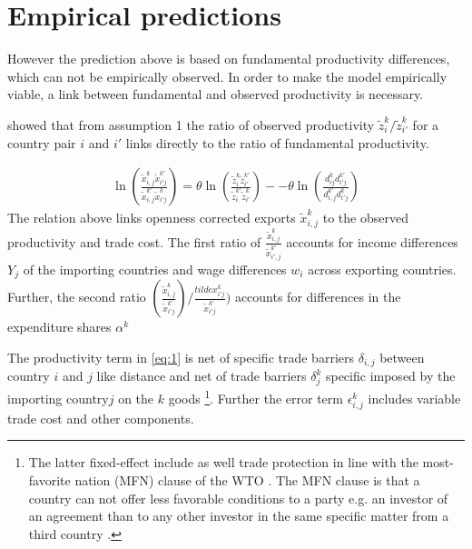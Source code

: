 \section{Empirical predictions}
However the prediction above is based on fundamental productivity differences, which can not be empirically observed. In order to make the model empirically viable, a link between fundamental and observed productivity is necessary. \par \textcite{costinot} showed that from assumption 1 the ratio of observed productivity $\tilde{z}^k_i / \tilde{z}^k_{i'}$ for a country pair $i$ and $i'$ %
links directly to the ratio of fundamental productivity.%
\par 
\begin{align} \ln \left( \frac{\tilde{x}_{i,j}^k \tilde{x}^{k'}_{i'j}}{\tilde{x}_{i,j}^{k'} \tilde{x}^{k}_{i'j}} \right) = \theta \ln \left( \frac{\tilde{z}_{i}^k \tilde{z}^{k'}_{i'}}{\tilde{z}_{i}^{k'} \tilde{z}^{k}_{i'}} \right)--\theta \ln \left( \frac{ d_{ij}^k d^{k'}_{i'j}}{d_{i,j}^{k'} {d}^{k}_{i'j}} \right) \end{align}
The relation above links openness corrected exports $\tilde{x}_{i,j}^k$ to the observed productivity and trade cost. The first ratio of  $\frac{\tilde{x}_{i,j}^k} { \tilde{x}_{i', j}^{k'} }$ accounts for income differences  $Y_j$ of the importing countries and wage differences $w_i$ across exporting countries. Further, the second ratio $(\frac{\tilde{x}_{i,j}^k}{\tilde{x}^{k'}_{i'j}})/ \frac{tilde{x}^{k}_{i'j}}{\tilde{x}^{k'}_{i'j}}) $ accounts for differences in the expenditure shares $\alpha^k$ %
\par 
The productivity term in \cref{eq:1} is net of specific trade barriers $\delta_{i,j}$ between country $i$ and $j$ like distance and net of trade barriers $\delta_j^k$ specific imposed by the importing country$j$ on the $k$ goods \footnote{The latter fixed-effect include as well  trade protection in line with the most-favorite nation (MFN) clause of the WTO \parencite{costinot}. The MFN clause is that a country can not offer less favorable conditions to a party e.g. an investor of an agreement than to any other investor in the same specific matter from a third country  \parencite{oecd-mfn}.}. Further the error term $\epsilon^k_{i,j}$ includes variable trade cost and other components.
